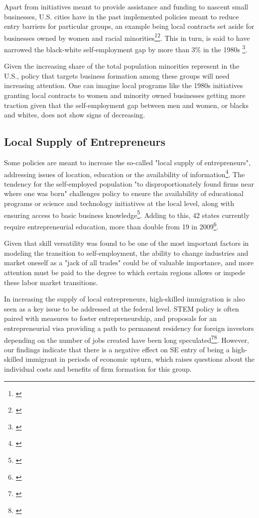 Apart from initiatives meant to provide assistance and funding to nascent small businesses, U.S. cities have in the past implemented policies meant to reduce entry barriers for particular groups, an example being local contracts set aside for businesses owned by women and racial minorities\footnote{\cite{ChatterjiGlaeserKerr2014}}\hspace{.15em}\footnote{\cite{Lerner2009}}. This in turn, is said to have narrowed the black-white self-employment gap by more than 3\% in the 1980s \footnote{\cite{ChatterjiGlaeserKerr2014}}.

Given the increasing share of the total population minorities represent in the U.S., policy that targets business formation among these groups will need increasing attention. One can imagine local programs like the 1980s initiatives granting local contracts to women and minority owned businesses getting more traction given that the self-employment gap between men and women, or blacks and whites, does not show signs of decreasing.  

\subsection{Local Supply of Entrepreneurs}

Some policies are meant to increase the so-called "local supply of entrepreneurs", addressing issues of location, education or the availability of information\footnote{\cite{Lerner2009}}. The tendency for the self-employed population "to disproportionately found firms near where one was born" challenges policy to ensure the availability of educational programs or science and technology initiatives at the local level, along with ensuring access to basic business knowledge\footnote{\cite{jones2013entrepreneurial}}. Adding to this, 42 states currently require entrepreneurial education, more than double from 19 in 2009\footnote{\cite{ChatterjiGlaeserKerr2014}}. 

Given that skill versatility was found to be one of the most important factors in modeling the transition to self-employment, the ability to change industries and market oneself as a "jack of all trades" could be of valuable importance, and more attention must be paid to the degree to which certain regions allows or impede these labor market transitions.

In increasing the supply of local entrepreneurs, high-skilled immigration is also seen as a key issue to be addressed at the federal level. STEM policy is often paired with measures to foster entrepreneurship, and proposals for an entrepreneurial visa providing a path to permanent residency for foreign investors depending on the number of jobs created have been long speculated\footnote{\cite{Dalziel2008}}\hspace{.15em}\footnote{\cite{ChatterjiGlaeserKerr2014}}. However, our findings indicate that there is a negative effect on SE entry of being a high-skilled immigrant in periods of economic upturn, which raises questions about the individual costs and benefits of firm formation for this group.

